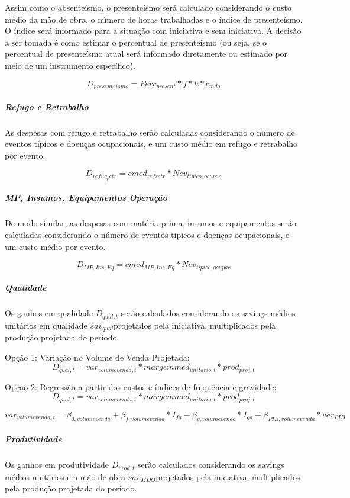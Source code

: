 \documentclass[]{article}
\let\oldsubparagraph\subparagraph
\renewcommand{\subparagraph}[1]{\oldsubparagraph{#1}\mbox{}}
\begin{document}
Assim como o absenteísmo, o presenteísmo será calculado considerando o
custo médio da mão de obra, o número de horas trabalhadas e o índice de
presenteísmo. O índice será informado para a situação com iniciativa e
sem iniciativa. A decisão a ser tomada é como estimar o percentual de
presenteísmo (ou seja, se o percentual de presenteísmo atual será
informado diretamente ou estimado por meio de um instrumento
específico).

\[D_{presenteismo} = Perc_{present} * f * h * c_{mdo}\]

\subparagraph{Refugo e Retrabalho}\label{refugo-e-retrabalho}

As despesas com refugo e retrabalho serão calculadas considerando o
número de eventos típicos e doenças ocupacionais, e um custo médio em
refugo e retrabalho por evento.

\[D_{refug_retr} = cmed_{refretr} * Nev_{tipico,ocupac}\]

\subparagraph{MP, Insumos, Equipamentos
Operação}\label{mp-insumos-equipamentos-operacao}

De modo similar, as despesas com matéria prima, insumos e equipamentos
serão calculadas considerando o número de eventos típicos e doenças
ocupacionais, e um custo médio por evento.

\[D_{MP,Ins,Eq} = cmed_{MP,Ins,Eq} * Nev_{tipico,ocupac}\]

\subparagraph{Qualidade}\label{qualidade}

Os ganhos em qualidade \(D_{qual,t}\) serão calculados considerando os
savings médios unitários em qualidade \(sav_{qual}\)projetados pela
iniciativa, multiplicados pela produção projetada do período.

Opção 1: Variação no Volume de Venda Projetada:
\[D_{qual,t} = var_{volumevenda,t} * margemmed_{unitario,t} * prod_{proj,t}\]

Opção 2: Regressão a partir dos custos e índices de frequência e
gravidade:
\[D_{qual,t} = var_{volumevenda,t} * margemmed_{unitario,t} * prod_{proj,t}\]

\[var_{volumevenda,t} = \beta_{0,volumevenda} +\beta_{f,volumevenda} * I_{fa} + \beta_{g,volumevenda} * I_{ga} + \beta_{PIB,volumevenda} * var_{PIB}\]

\subparagraph{Produtividade}\label{produtividade}

Os ganhos em produtividade \(D_{prod,t}\) serão calculados considerando
os savings médios unitários em mão-de-obra \(sav_{MDO}\)projetados pela
iniciativa, multiplicados pela produção projetada do período.
\end{document}
